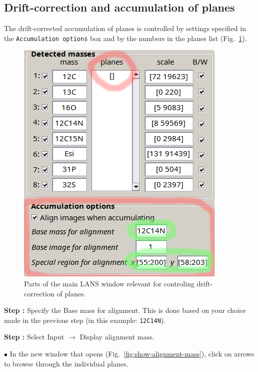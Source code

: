 \documentclass[a4paper, 11pt]{article}
\newcommand{\ttt}[1]{\texttt{#1}}
\newcommand{\lans}[1]{{\color{magenta}#1}}
\newcommand{\lanstf}[1]{{\color{cyan}#1}}
\newcommand\ra{\rightarrow}
\newcounter{step}
\newcommand\s{\addtocounter{step}{1}\vskip5pt\noindent\textbf{Step \thestep:}{ }}
\newcommand\bul{\vskip5pt\noindent$\bullet${ }}
\begin{document}

\subsection{Drift-correction and accumulation of planes}
\setcounter{step}{0}

The drift-corrected accumulation of planes is controlled by settings specified in the \ttt{Accumulation options} box and by the numbers in the \lanstf{planes} list (Fig.~\ref{fig:alignoptions}). 

\begin{figure}[!ht]
\centering
\includegraphics[scale=0.4]{figs3/LANS-main-alignment}
\caption{\label{fig:alignoptions}%
Parts of the main LANS window relevant for controling drift-correction of planes.}
\end{figure}

\s Specify the \lanstf{Base mass for alignment}. This is done based on your choice made in the previous step (in this example: \ttt{12C14N}). 

\s Select \lans{Input} $\ra$ \lans{Display alignment mass}. 

\bul In the new window that opens (Fig.~\ref{fig:show-alignment-mass}), click on \lans{arrows} to browse through the individual planes. 
\end{document}
